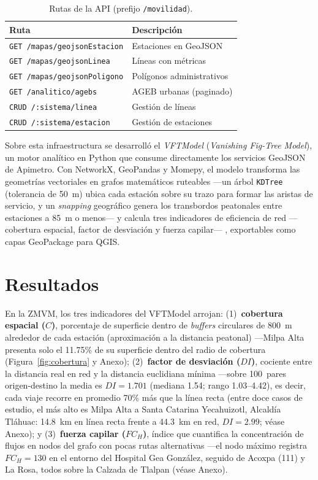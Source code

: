 \documentclass{isprs} %
\begin{document}
\begin{table}[t]
  \centering
  \footnotesize
  \begin{tabular}{|l|l|}
    \hline
    \textbf{Ruta} & \textbf{Descripción} \\ \hline
    \texttt{GET /mapas/geojsonEstacion}  & Estaciones en GeoJSON \\ \hline
    \texttt{GET /mapas/geojsonLinea}     & Líneas con métricas \\ \hline
    \texttt{GET /mapas/geojsonPoligono}  & Polígonos administrativos \\ \hline
    \texttt{GET /analitico/agebs}        & AGEB urbanas (paginado) \\ \hline
    \texttt{CRUD /:sistema/linea}        & Gestión de líneas \\ \hline
    \texttt{CRUD /:sistema/estacion}     & Gestión de estaciones \\ \hline
  \end{tabular}
  \caption{Rutas de la API (prefijo \texttt{/movilidad}).}
  \label{tab:rutas-api}
\end{table}

Sobre esta infraestructura se desarrolló el
\textit{VFTModel} (\textit{Vanishing Fig-Tree Model}),
un motor analítico en Python que consume directamente los servicios GeoJSON de
Apimetro.  Con NetworkX, GeoPandas y Momepy, el modelo
transforma las geometrías vectoriales en grafos
matemáticos ruteables ---un árbol \texttt{KDTree} (tolerancia de 50~m) ubica cada
estación sobre su trazo para formar las aristas de servicio, y un \textit{snapping}
geográfico genera los transbordos peatonales entre estaciones a 85~m o menos--- y
calcula tres indicadores de eficiencia de red ---cobertura espacial, factor de
desviación y fuerza capilar--- \citep{fortin2016innovative}, exportables como capas
GeoPackage para QGIS.

\section{Resultados}\label{sec:Resultados}

En la ZMVM, los tres indicadores del VFTModel arrojan:
(1)~\textbf{cobertura espacial ($C$)}, porcentaje de superficie dentro de
\textit{buffers} circulares de 800~m alrededor de cada estación (aproximación a la distancia peatonal) ---Milpa Alta presenta solo el 11.75\% de su superficie dentro del
radio de cobertura (Figura~\ref{fig:cobertura} y Anexo);
(2)~\textbf{factor de desviación ($DI$)}, cociente entre la
distancia real en red y la distancia euclidiana mínima ---sobre 100~pares
origen-destino la media es $DI=1.701$ (mediana 1.54; rango 1.03--4.42), es decir,
cada viaje recorre en promedio 70\% más que la línea recta (entre doce casos de
estudio, el más alto es Milpa Alta a Santa Catarina Yecahuizotl, Alcaldía Tláhuac:
14.8~km en línea recta frente a 44.3~km en red, $DI=2.99$; véase Anexo); y
(3)~\textbf{fuerza capilar ($FC_H$)}, índice que cuantifica la concentración de
flujos en nodos del grafo con pocas rutas alternativas ---el nodo máximo registra
$FC_H=130$ en el entorno del Hospital Gea González, seguido de Acoxpa (111) y
La Rosa, todos sobre la Calzada de Tlalpan (véase Anexo).
\end{document}

